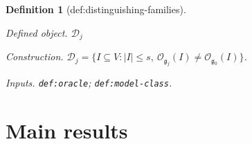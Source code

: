 \documentclass{article}
\newtheorem{definition}{Definition}
\begin{document}
\begin{definition}[def:distinguishing-families]\label{def:distinguishing-families}
\par\smallskip\noindent\emph{Defined object.} \(\mathscr D_j\)
\par\smallskip\noindent\emph{Construction.} \(\mathscr D_j=\{I\subseteq V:|I|\le s,\ \mathcal O_{\mathfrak g_j}(I)\ne\mathcal O_{\mathfrak g_0}(I)\}\).
\par\smallskip\noindent\emph{Inputs.} \texttt{def:\allowbreak{}oracle}; \texttt{def:\allowbreak{}model-\allowbreak{}class}.
\end{definition}

\section{Main results}
\end{document}
